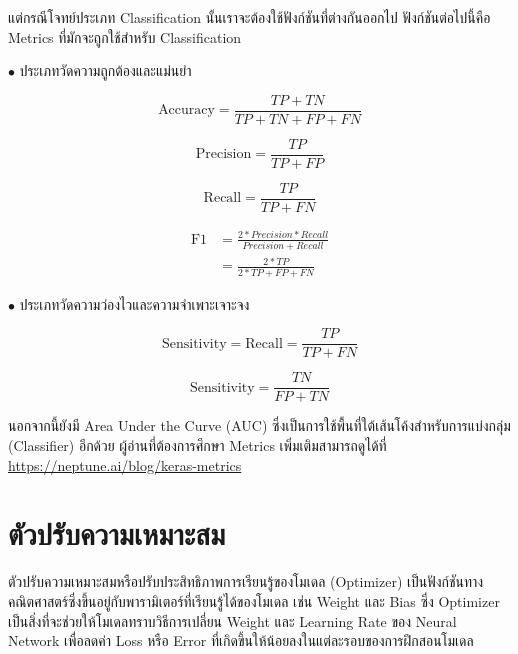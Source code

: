 แต่กรณีโจทย์ประเภท Classification นั้นเราจะต้องใช้ฟังก์ชันที่ต่างกันออกไป ฟังก์ชันต่อไปนี้คือ Metrics ที่มักจะถูกใช้สำหรับ Classification

\noindent $\bullet$ ประเภทวัดความถูกต้องและแม่นยำ

\begin{equation}
    \text{Accuracy} = \frac{TP+TN}{TP+TN+FP+FN}
\end{equation}

\begin{equation}
    \text{Precision} = \frac{TP}{TP+FP}
\end{equation}

\begin{equation}
    \text{Recall} = \frac{TP}{TP+FN}
\end{equation}

\begin{align}
    \text{F1} & = \frac{2*Precision*Recall}{Precision+Recall} \nonumber \\
              & = \frac{2*TP}{2*TP+FP+FN}
\end{align}

\noindent $\bullet$ ประเภทวัดความว่องไวและความจำเพาะเจาะจง

\begin{equation}
    \text{Sensitivity} = \text{Recall} = \frac{TP}{TP+FN}
\end{equation}

\begin{equation}
    \text{Sensitivity} = \frac{TN}{FP+TN}
\end{equation}

นอกจากนี้ยังมี Area Under the Curve (AUC) ซึ่งเป็นการใช้พื้นที่ใต้เส้นโค้งสำหรับการแบ่งกลุ่ม (Classifier) อีกด้วย ผู้อ่านที่ต้องการศึกษา
Metrics เพิ่มเติมสามารถดูได้ที่ \url{https://neptune.ai/blog/keras-metrics}

\section{ตัวปรับความเหมาะสม}
\label{sec:optimizer}

ตัวปรับความเหมาะสมหรือปรับประสิทธิภาพการเรียนรู้ของโมเดล (Optimizer) เป็นฟังก์ชันทางคณิตศาสตร์ซึ่งขึ้นอยู่กับพารามิเตอร์ที่เรียนรู้ได้ของโมเดล
เช่น Weight และ Bias ซึ่ง Optimizer เป็นสิ่งที่จะช่วยให้โมเดลทราบวิธีการเปลี่ยน Weight และ Learning Rate ของ Neural Network
เพื่อลดค่า Loss หรือ Error ที่เกิดขึ้นให้น้อยลงในแต่ละรอบของการฝึกสอนโมเดล

